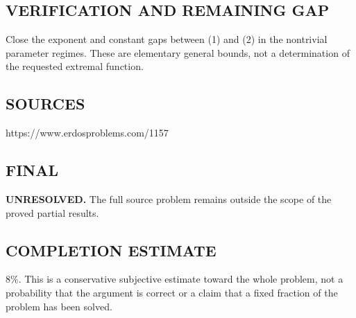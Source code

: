 \subsection*{VERIFICATION AND REMAINING GAP}
Close the exponent and constant gaps between (1) and (2) in the nontrivial
parameter regimes. These are elementary general bounds, not a determination
of the requested extremal function.

\subsection*{SOURCES}
https://www.erdosproblems.com/1157

\subsection*{FINAL}
\textbf{UNRESOLVED.} The full source problem remains outside the scope of the proved partial results.

\subsection*{COMPLETION ESTIMATE}
$8\%$. This is a conservative subjective estimate toward the whole problem, not a probability that the argument is correct or a claim that a fixed fraction of the problem has been solved.
